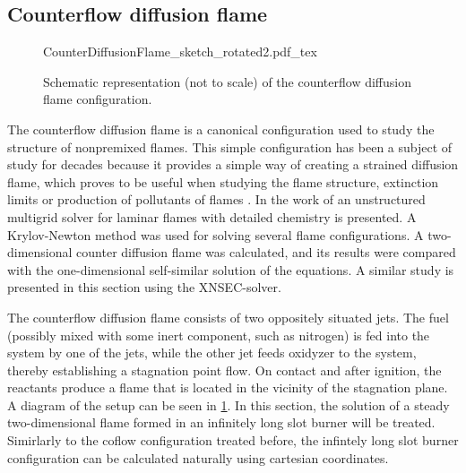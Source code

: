
\subsection[Counterflow diffusion flame]{Counterflow diffusion flame \footnotemark}\label{ss:CDF}
\begin{figure}[h!]
	\begin{center}
		\def\svgwidth{0.8\textwidth}
		{CounterDiffusionFlame_sketch_rotated2.pdf_tex}
		\caption{Schematic representation (not to scale) of the counterflow diffusion flame configuration.}
		\label{fig:CDFScheme}
	\end{center}
\end{figure}

The counterflow diffusion flame is a canonical configuration used to study the structure of nonpremixed flames. This simple configuration has been a subject of study for decades because it provides a simple way of creating a strained diffusion flame, which proves to be useful when studying the flame structure, extinction limits or production of pollutants of flames \parencite{pandyaStructureFlatCounterFlow1964,spaldingTheoryMixingChemical1961,keyesFlameSheetStarting1987, leeTwodimensionalDirectNumerical2000}. 
In the work of \textcite{paxionDevelopmentParallelUnstructured2001} an unstructured multigrid solver for laminar flames with detailed chemistry is presented. A Krylov-Newton method was used for solving several flame configurations. A two-dimensional counter diffusion flame was calculated, and its results were compared with the one-dimensional self-similar solution of the equations. A similar study is presented in this section using the XNSEC-solver.

The counterflow diffusion flame consists of two oppositely situated jets. The fuel (possibly mixed with some inert component, such as nitrogen) is fed into the system by one of the jets, while the other jet feeds oxidyzer to the system, thereby establishing a stagnation point flow. On contact and after ignition, the reactants produce a flame that is located in the vicinity of the stagnation plane. A diagram of the setup can be seen in \cref{fig:CDFScheme}. In this section, the solution of a steady two-dimensional flame formed in an infinitely long slot burner will be treated. Simirlarly to the coflow configuration treated before, the infintely long slot burner configuration can be calculated naturally using cartesian coordinates.

